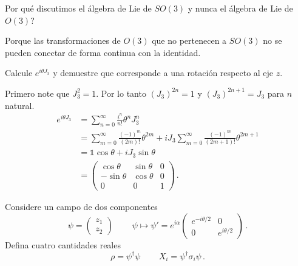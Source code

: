 \documentclass[12pt]{exam}
\begin{document}
\pagebreak

\begin{questions}


Por qué discutimos el álgebra de Lie de $SO(3)$ y nunca el álgebra de Lie de $O(3)$?

{\color{RedViolet}\small
  Porque las transformaciones de $O(3)$ que no pertenecen a $SO(3)$ no se pueden conectar de forma continua con la identidad.
}

\pagebreak


Calcule $e^{i\theta J_3}$ y demuestre que corresponde a una rotación respecto al eje $z$.

  {\color{RedViolet}\small
    Primero note que $J_3^2 = 1$. Por lo tanto $(J_3)^{2n} = 1$ y $(J_3)^{2n + 1} = J_3$ para $n$ natural.
    \begin{align*}
      e^{i\theta J_3} &= \sum_{n = 0}^\infty\frac{i^n}{n!}\theta^n J_3^n\\ 
                      &= \sum_{m = 0}^\infty \frac{(-1)^m}{(2m)!}\theta^{2m} + iJ_3\sum_{m = 0}^{\infty}\frac{(-1)^m}{(2m + 1)!}\theta^{2m + 1}\\
                      &= \mathbb{1}\cos\theta + i J_3 \sin\theta\\
                      &= \begin{pmatrix} \cos\theta & \sin{\theta} & 0 \\ -\sin\theta & \cos\theta & 0 \\ 0 & 0 & 1\end{pmatrix}\,.
    \end{align*}
  }

\pagebreak


Considere un campo de dos componentes
\[
  \psi = \begin{pmatrix}z_1 \\ z_2\end{pmatrix}\,\qquad \psi \mapsto \psi' = e^{i\alpha}\begin{pmatrix}e^{-i\theta/2} & 0 \\ 0 & e^{i\theta/2}\end{pmatrix}\,.
\]
Defina cuatro cantidades reales
\[
  \rho = \psi^\dagger \psi\,\qquad X_i = \psi^\dagger \sigma_i \psi\,.
\]


\end{questions}
\end{document}
